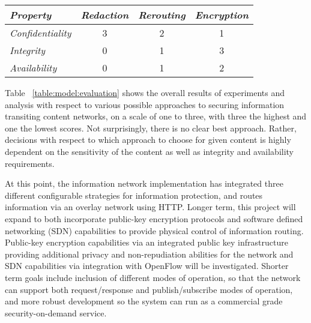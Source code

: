 \begin{table*}[tp] %
\centering %
\begin{tabular}{lccc}
\toprule %
{\it Property}			& {\it Redaction}	& {\it Rerouting} 	& {\it Encryption} 	\\\toprule
{\it Confidentiality} 	& 3				  	& 2					& 1				 	\\\midrule
{\it Integrity}			& 0					& 1					& 3 					\\\midrule
{\it Availability}		& 0					& 1					& 2					\\\bottomrule
\end{tabular}
\caption{Approach Evaluation Summary}
\label{table:model:evaluation}
\end{table*}

Table ~\ref{table:model:evaluation} shows the overall results of experiments and analysis with respect to various possible approaches to securing information transiting content networks, on a scale of one to three, with three the highest and one the lowest scores.  Not surprisingly, there is no clear best approach.  Rather, decisions with respect to which approach to choose for given content is highly dependent on the sensitivity of the content as well as integrity and availability requirements.
	
At this point, the information network implementation has integrated three different configurable strategies for information protection, and routes information via an overlay network using HTTP.  Longer term, this project will expand to both incorporate public-key encryption protocols and software defined networking (SDN) capabilities to provide physical control of information routing.  Public-key encryption capabilities via an integrated public key infrastructure providing additional privacy and non-repudiation abilities for the network and SDN capabilities via integration with OpenFlow will be investigated.  Shorter term goals include inclusion of different modes of operation, so that the network can support both request/response and publish/subscribe modes of operation, and more robust development so the system can run as a commercial grade security-on-demand service.

